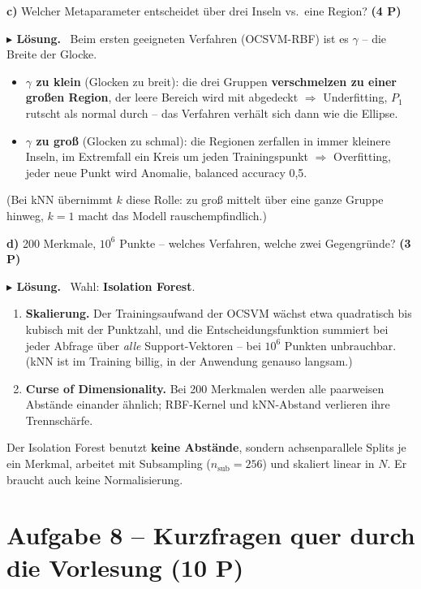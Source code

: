 \documentclass[10pt,a4paper]{article}
\newcommand{\pkt}[1]{\hfill\textbf{(#1 P)}}
\newenvironment{loes}%
  {\par\vspace{2pt}\begingroup\small\noindent\textbf{\color{loesfarbe}$\blacktriangleright$ Lösung.}\ }%
  {\endgroup\par\vspace{5pt}}
\begin{document}
\textbf{c)} Welcher Metaparameter entscheidet über drei Inseln vs.\ eine Region? \pkt{4}

\begin{loes}
Beim ersten geeigneten Verfahren (OCSVM-RBF) ist es \textbf{$\gamma$} -- die Breite der Glocke.
\begin{itemize}
\item \textbf{$\gamma$ zu klein} (Glocken zu breit): die drei Gruppen \textbf{verschmelzen zu einer
  großen Region}, der leere Bereich wird mit abgedeckt $\Rightarrow$ Underfitting, $P_1$ rutscht
  als normal durch -- das Verfahren verhält sich dann wie die Ellipse.
\item \textbf{$\gamma$ zu groß} (Glocken zu schmal): die Regionen zerfallen in immer kleinere
  Inseln, im Extremfall ein Kreis um jeden Trainingspunkt $\Rightarrow$ Overfitting, jeder neue
  Punkt wird Anomalie, balanced accuracy 0,5.
\end{itemize}
(Bei kNN übernimmt \textbf{$k$} diese Rolle: zu groß mittelt über eine ganze Gruppe hinweg,
$k=1$ macht das Modell rauschempfindlich.)
\end{loes}

\textbf{d)} 200 Merkmale, $10^6$ Punkte -- welches Verfahren, welche zwei Gegengründe? \pkt{3}

\begin{loes}
Wahl: \textbf{Isolation Forest}.
\begin{enumerate}
\item \textbf{Skalierung.} Der Trainingsaufwand der OCSVM wächst etwa quadratisch bis kubisch mit
  der Punktzahl, und die Entscheidungsfunktion summiert bei jeder Abfrage über \emph{alle}
  Support-Vektoren -- bei $10^6$ Punkten unbrauchbar. (kNN ist im Training billig, in der Anwendung
  genauso langsam.)
\item \textbf{Curse of Dimensionality.} Bei 200 Merkmalen werden alle paarweisen Abstände einander
  ähnlich; RBF-Kernel und kNN-Abstand verlieren ihre Trennschärfe.
\end{enumerate}
Der Isolation Forest benutzt \textbf{keine Abstände}, sondern achsenparallele Splits je ein Merkmal,
arbeitet mit Subsampling ($n_{\text{sub}} = 256$) und skaliert linear in $N$. Er braucht auch keine
Normalisierung.
\end{loes}

\newpage
\section*{Aufgabe 8 -- Kurzfragen quer durch die Vorlesung \pkt{10}}
\end{document}
